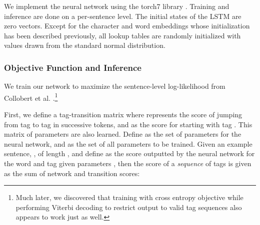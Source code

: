 \documentclass[11pt,letterpaper]{article}
\begin{document}
We implement the neural network using the torch7 library \cite{collobert2011torch7}. Training and inference are done on a per-sentence level. The initial states of the LSTM are zero vectors. Except for the character and word embeddings whose initialization has  been described previously, all lookup tables are randomly initialized with values drawn from the standard normal distribution. 

\subsubsection{Objective Function and Inference}

We train our network to maximize the sentence-level log-likelihood from Collobert et al. .\footnote{Much later, we discovered that training with cross entropy objective while performing Viterbi decoding to restrict output to valid tag sequences also appears to work just as well.}

First, we define a tag-transition matrix  where  represents the score of jumping from tag  to tag  in successive tokens, and  as the score for starting with tag . This matrix of parameters are also learned. Define  as the set of parameters for the neural network, and  as the set of all parameters to be trained. Given an example sentence,  , of length , and define  as the score outputted by the neural network for the  word and  tag given parameters , then the score of a \emph{sequence} of tags  is given as the sum of network and transition scores:
\end{document}
